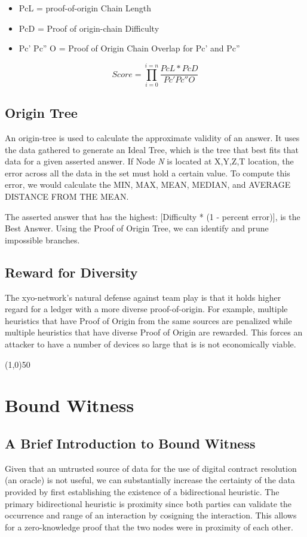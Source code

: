 \documentclass{article}
\begin{document}
\begin{itemize}
\item PcL = \Gls{proof-of-origin} Chain Length
\item PcD = Proof of \Gls{origin-chain} Difficulty
\item Pc' Pc'' O = Proof of Origin Chain Overlap for Pc' and Pc''
\end{itemize}

\begin{equation*}\tag{1} \label{eq1}
Score = \prod_{i=0}^{i=n} \frac{PcL*PcD}{Pc' Pc'' O}
\end{equation*}

\subsection {Origin Tree}
An \Gls{origin-tree} is used to calculate the approximate validity of an answer. It uses the data gathered to generate an Ideal Tree, which is the tree that best fits that data for a given asserted answer. If Node \textit{N} is located at X,Y,Z,T location, the error across all the data in the set must hold a certain value. To compute this error, we would calculate the MIN, MAX, MEAN, MEDIAN, and AVERAGE DISTANCE FROM THE MEAN.

The asserted answer that has the highest: [Difficulty * (1 - percent error)], is the Best Answer. Using the Proof of Origin Tree, we can identify and prune impossible branches.

\subsection {Reward for Diversity}
The \Gls{xyo-network}'s natural defense against team play is that it holds higher regard for a ledger with a more diverse \Gls{proof-of-origin}. For example, multiple \glspl{heuristic} that have Proof of Origin from the same sources are penalized while multiple heuristics that have diverse Proof of Origin are rewarded. This forces an attacker to have a number of devices so large that is is not economically viable.

\begin{center}
\line(1,0){50}
\end{center}

\section {Bound Witness}

\subsection {A Brief Introduction to Bound Witness}
Given that an untrusted source of data for the use of digital contract resolution (an \gls{oracle}) is not useful, we can substantially increase the \gls{certainty} of the data provided by first establishing the existence of a bidirectional \gls{heuristic}. The primary bidirectional heuristic is proximity since both parties can validate the occurrence and range of an interaction by cosigning the interaction. This allows for a zero-knowledge proof that the two nodes were in proximity of each other. 
\end{document}
